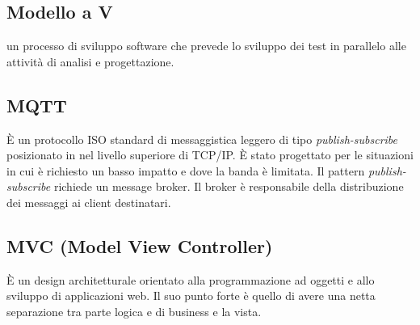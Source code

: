 \subsection*{Modello a V} un processo di sviluppo software che prevede lo sviluppo dei test in parallelo alle attività di analisi e progettazione.

\subsection*{MQTT} È un protocollo ISO standard di messaggistica leggero di tipo \textit{publish-subscribe} posizionato in nel livello superiore di TCP/IP. È stato progettato per le situazioni in cui è richiesto un basso impatto e dove la banda è limitata. Il pattern \textit{publish-subscribe} richiede un message broker. Il broker è responsabile della distribuzione dei messaggi ai client destinatari.

\subsection*{MVC (Model View Controller)} È un design architetturale orientato alla programmazione ad oggetti  e allo sviluppo di applicazioni web. Il suo punto forte è quello di avere una netta separazione tra parte logica e di business e la vista.